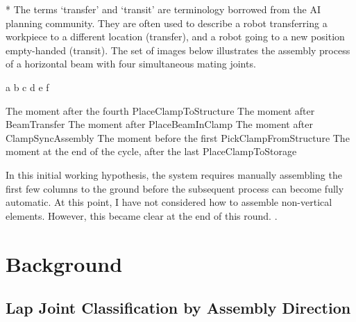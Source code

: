 * The terms ‘transfer’ and ‘transit’ are terminology borrowed from the AI planning community. They are often used to describe a robot transferring a workpiece to a different location (transfer), and a robot going to a new position empty-handed (transit).
The set of images below illustrates the assembly process of a horizontal beam with four simultaneous mating joints. 

a
b
c
d
e
f

The moment after the fourth PlaceClampToStructure 
The moment after BeamTransfer
The moment after PlaceBeamInClamp
The moment after ClampSyncAssembly
The moment before the first PickClampFromStructure
The moment at the end of the cycle, after the last PlaceClampToStorage

In this initial working hypothesis, the system requires manually assembling the first few columns to the ground before the subsequent process can become fully automatic. At this point, I have not considered how to assemble non-vertical elements. However, this became clear at the end of this round. .

\section{Background}
\label{section:exploration_1_background}

\subsection{Lap Joint Classification by Assembly Direction}
\label{subsection:exploration_1_lap_joint_classification_by_assembly_direction}

